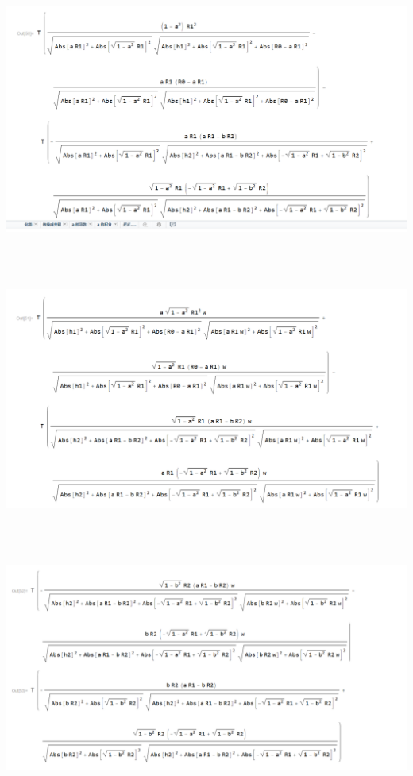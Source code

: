 \documentclass[12pt,a4paper]{ctexart}
\begin{document}
	\includegraphics[scale=0.4]{T001.PNG}\
	
	
	
	\noindent\textbf{}


	\textbf{}\
	
	
	
	\includegraphics[scale=0.4]{T011.PNG}\
	
	
	
	\noindent\textbf{}
		\thispagestyle{empty}
	\textbf{}\
	
	
	
	\includegraphics[scale=0.4]{T012.PNG}\
	
\end{document}
